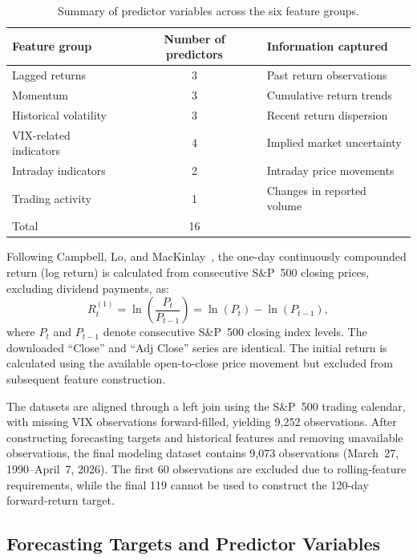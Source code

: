 \documentclass[runningheads,orivec]{llncs}
\begin{document}
\begin{table}[htbp]
\caption{Summary of predictor variables across the six feature groups.}\label{tab:predictors}
\centering
\begin{tabular}{lcl}
\hline
Feature group & Number of predictors & Information captured \\
\hline
Lagged returns & 3 & Past return observations \\
Momentum & 3 & Cumulative return trends \\
Historical volatility & 3 & Recent return dispersion \\
VIX-related indicators & 4 & Implied market uncertainty \\
Intraday indicators & 2 & Intraday price movements \\
Trading activity & 1 & Changes in reported volume \\
\hline
Total & 16 & \\
\hline
\end{tabular}
\end{table}

Following Campbell, Lo, and MacKinlay~\cite{campbell1998}, the one-day continuously compounded return (log return) is calculated from consecutive S\&P~500 closing prices, excluding dividend payments, as:
\begin{equation}\label{eq:daily_log_return}
R_t^{(1)} = \ln\left(\frac{P_t}{P_{t-1}}\right) = \ln(P_t) - \ln(P_{t-1}),
\end{equation}
where $P_t$ and $P_{t-1}$ denote consecutive S\&P~500 closing index levels. The downloaded ``Close'' and ``Adj Close'' series are identical. The initial return is calculated using the available open-to-close price movement but excluded from subsequent feature construction.

The datasets are aligned through a left join using the S\&P~500 trading calendar, with missing VIX observations forward-filled, yielding 9,252 observations. After constructing forecasting targets and historical features and removing unavailable observations, the final modeling dataset contains 9,073 observations (March~27, 1990--April~7, 2026). The first 60 observations are excluded due to rolling-feature requirements, while the final 119 cannot be used to construct the 120-day forward-return target.

\subsection{Forecasting Targets and Predictor Variables}\label{subsec:targets_predictors}
\end{document}

